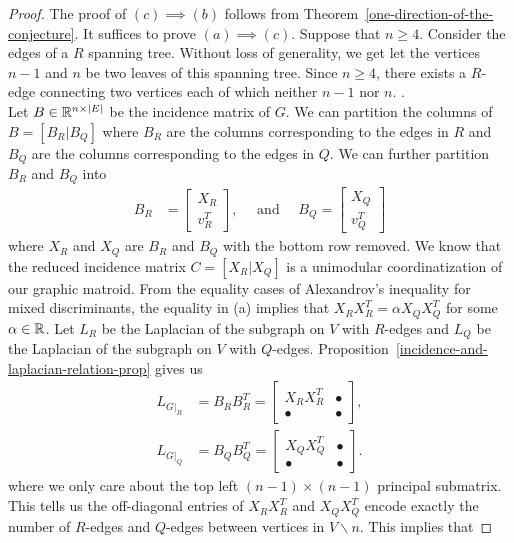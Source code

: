 \documentclass{puthesis-UG}
\begin{document}
\begin{proof}
	The proof of $(c) \implies (b)$ follows from Theorem~\ref{one-direction-of-the-conjecture}. It suffices to prove $(a) \implies (c)$. Suppose that $n \geq 4$. Consider the edges of a $R$ spanning tree. Without loss of generality, we get let the vertices $n-1$ and $n$ be two leaves of this spanning tree. Since $n \geq 4$, there exists a $R$-edge connecting two vertices each of which neither $n-1$ nor $n$. . \\

	Let $B \in \mathbb{R}^{n \times |E|}$ be the incidence matrix of $G$. We can partition the columns of $B = [B_R | B_Q]$ where $B_R$ are the columns corresponding to the edges in $R$ and $B_Q$ are the columns corresponding to the edges in $Q$. We can further partition $B_R$ and $B_Q$ into
	\begin{align*}
		B_R & = \begin{bmatrix} X_R \\ v_R^T \end{bmatrix}, \quad \text{ and } \quad B_Q = \begin{bmatrix} X_Q \\ v_Q^T \end{bmatrix}
	\end{align*}
	where $X_R$ and $X_Q$ are $B_R$ and $B_Q$ with the bottom row removed. We know that the reduced incidence matrix $C = [X_R | X_Q]$ is a unimodular coordinatization of our graphic matroid. From the equality cases of Alexandrov's inequality for mixed discriminants, the equality in (a) implies that $X_RX_R^T = \alpha X_Q X_Q^T$ for some $\alpha \in \mathbb{R}$. Let $L_R$ be the Laplacian of the subgraph on $V$ with $R$-edges and $L_Q$ be the Laplacian of the subgraph on $V$ with $Q$-edges. Proposition~\ref{incidence-and-laplacian-relation-prop} gives us
	\begin{align*}
		L_{G|_R} & = B_R B_R^T = \begin{bmatrix}
			X_RX_R^T & \bullet \\ \bullet & \bullet
		\end{bmatrix}, \\
		L_{G|_Q} & = B_Q B_Q^T = \begin{bmatrix}
			X_Q X_Q^T & \bullet \\ \bullet & \bullet
		\end{bmatrix}.
	\end{align*}
	where we only care about the top left $(n-1) \times (n-1)$ principal submatrix. This tells us the off-diagonal entries of $X_R X_R^T$ and $X_QX_Q^T$ encode exactly the number of $R$-edges and $Q$-edges between vertices in $V \backslash n$. This implies that 

\end{proof}
\end{document}
